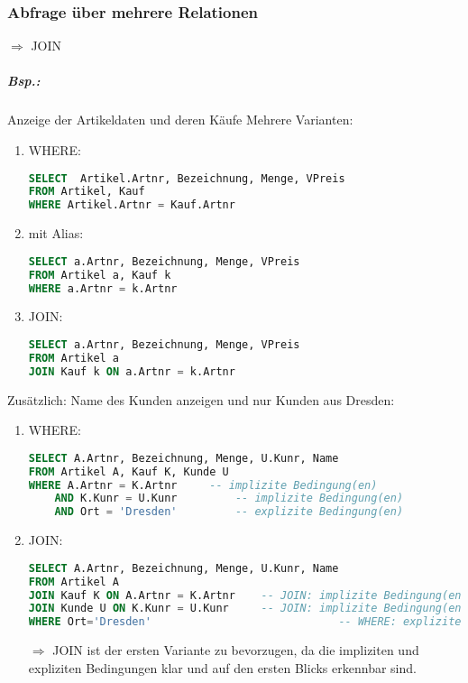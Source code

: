 \subsubsection{Abfrage über mehrere Relationen}
$\Rightarrow$ JOIN
\subparagraph{Bsp.:} Anzeige der Artikeldaten und deren Käufe
Mehrere Varianten:
\begin{enumerate}
\item WHERE:
\begin{lstlisting}[language=SQL]
SELECT  Artikel.Artnr, Bezeichnung, Menge, VPreis
FROM Artikel, Kauf
WHERE Artikel.Artnr = Kauf.Artnr
\end{lstlisting}
\item mit Alias:
\begin{lstlisting}[language=SQL]
SELECT a.Artnr, Bezeichnung, Menge, VPreis
FROM Artikel a, Kauf k
WHERE a.Artnr = k.Artnr
\end{lstlisting}
\item JOIN:
\begin{lstlisting}[language=SQL]
SELECT a.Artnr, Bezeichnung, Menge, VPreis
FROM Artikel a
JOIN Kauf k ON a.Artnr = k.Artnr
\end{lstlisting}
\end{enumerate} 
Zusätzlich: Name des Kunden anzeigen und nur Kunden aus Dresden:
\begin{enumerate}
\item WHERE:
\begin{lstlisting}[language=SQL]
SELECT A.Artnr, Bezeichnung, Menge, U.Kunr, Name
FROM Artikel A, Kauf K, Kunde U
WHERE A.Artnr = K.Artnr		-- implizite Bedingung(en)
	AND K.Kunr = U.Kunr			-- implizite Bedingung(en)
	AND Ort = 'Dresden'			-- explizite Bedingung(en)
\end{lstlisting}
\item JOIN:
\begin{lstlisting}[language=SQL]
SELECT A.Artnr, Bezeichnung, Menge, U.Kunr, Name
FROM Artikel A
JOIN Kauf K ON A.Artnr = K.Artnr	-- JOIN: implizite Bedingung(en)
JOIN Kunde U ON K.Kunr = U.Kunr		-- JOIN: implizite Bedingung(en)
WHERE Ort='Dresden'								-- WHERE: explizite Bedingung(en)
\end{lstlisting}
$\Rightarrow$ JOIN ist der ersten Variante zu bevorzugen, da die impliziten und expliziten Bedingungen klar und auf den ersten Blicks erkennbar sind.
\end{enumerate}
